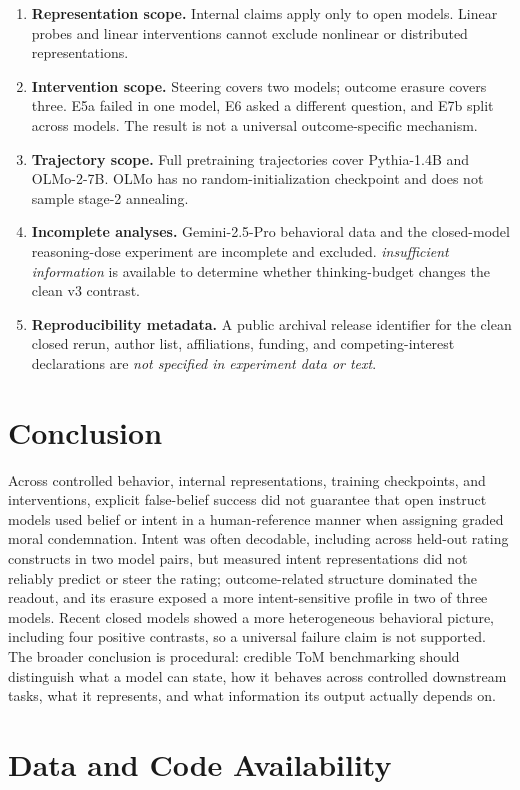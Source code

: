 \documentclass[11pt]{article}
\newcommand{\missinginfo}{\textit{not specified in experiment data or text}}
\newcommand{\insufficient}{\textit{insufficient information}}
\begin{document}
\begin{enumerate}[leftmargin=*]
    \item \textbf{Representation scope.} Internal claims apply only to open models. Linear probes and linear interventions cannot exclude nonlinear or distributed representations.
    \item \textbf{Intervention scope.} Steering covers two models; outcome erasure covers three. E5a failed in one model, E6 asked a different question, and E7b split across models. The result is not a universal outcome-specific mechanism.
    \item \textbf{Trajectory scope.} Full pretraining trajectories cover Pythia-1.4B and OLMo-2-7B. OLMo has no random-initialization checkpoint and does not sample stage-2 annealing.
    \item \textbf{Incomplete analyses.} Gemini-2.5-Pro behavioral data and the closed-model reasoning-dose experiment are incomplete and excluded. \insufficient{} is available to determine whether thinking-budget changes the clean v3 contrast.
    \item \textbf{Reproducibility metadata.} A public archival release identifier for the clean closed rerun, author list, affiliations, funding, and competing-interest declarations are \missinginfo.
\end{enumerate}

\section{Conclusion}

Across controlled behavior, internal representations, training checkpoints, and interventions, explicit false-belief success did not guarantee that open instruct models used belief or intent in a human-reference manner when assigning graded moral condemnation.
Intent was often decodable, including across held-out rating constructs in two model pairs, but measured intent representations did not reliably predict or steer the rating; outcome-related structure dominated the readout, and its erasure exposed a more intent-sensitive profile in two of three models.
Recent closed models showed a more heterogeneous behavioral picture, including four positive contrasts, so a universal failure claim is not supported.
The broader conclusion is procedural: credible ToM benchmarking should distinguish what a model can state, how it behaves across controlled downstream tasks, what it represents, and what information its output actually depends on.

\section*{Data and Code Availability}
\end{document}
